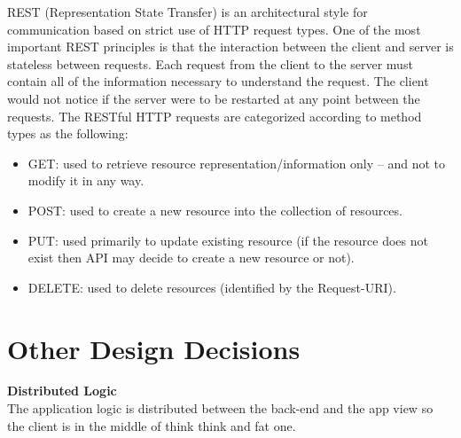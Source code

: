 \documentclass[../RASD.tex]{subfiles}
\begin{document}
    REST (Representation State Transfer) is an architectural style for communication based on strict use of HTTP request types.
    One of the most important REST principles is that the interaction between the client and server is stateless between requests.
    Each request from the client to the server must contain all of the information necessary to understand the request.
    The client would not notice if the server were to be restarted at any point between the requests.
    The RESTful HTTP requests are categorized according to method types as the following:
    \\
    \begin{itemize}
        \item GET: used to retrieve resource representation/information only – and not to modify it in any way.
        \item POST: used to create a new resource into the collection of resources.
        \item PUT: used primarily to update existing resource (if the resource does not exist
        then API may decide to create a new resource or not).
        \item DELETE: used to delete resources (identified by the Request-URI).
    \end{itemize}
    \newpage
    \section{Other Design Decisions}\label{sec:other-design-decisions}
    \textbf{Distributed Logic} \\
    The application logic is distributed between the back-end and the app view so the client is in the middle of think think and fat one.
\end{document}
